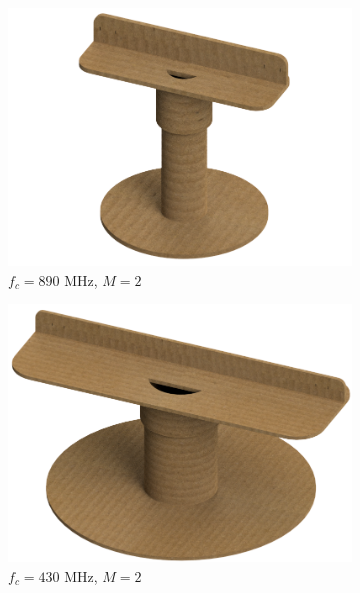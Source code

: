 \documentclass[12pt,a4paper]{report}
\begin{document}
\begin{figure}[h]
    \centering
    \begin{subfigure}{0.3\textwidth}
        \includegraphics[width = \textwidth]{Figures/tb_cad_890.png}
        \caption{$f_c = 890 \text{ MHz}$, $M = 2$}
    \end{subfigure}
    \begin{subfigure}{0.3\textwidth}
        \includegraphics[width = \textwidth]{Figures/tb_cad_430.png}
        \caption{$f_c = 430 \text{ MHz}$, $M = 2$}
    \end{subfigure}
    \begin{subfigure}{0.3\textwidth}

\end{subfigure}
\end{figure}
\end{document}
